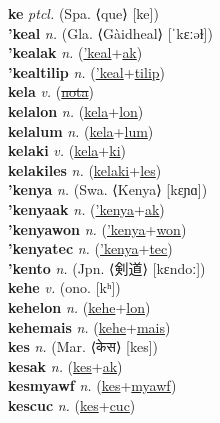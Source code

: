 \textbf{ke} \textit{ptcl.} (Spa. ⟨que⟩ [ke])
 \label{ke} \\
\textbf{'keal} \textit{n.} (Gla. ⟨Gàidheal⟩ [ˈkɛːəɫ])
 \label{'keal} \\
\textbf{'kealak} \textit{n.} (\hyperref['keal]{'keal}+\hyperref[ak]{ak})
 \label{'kealak} \\
\textbf{'kealtilip} \textit{n.} (\hyperref['keal]{'keal}+\hyperref[tilip]{tilip})
 \label{'kealtilip} \\
\textbf{kela} \textit{v.} (\hyperref[nota]{\sout{nota}})
 \label{kela} \\
\textbf{kelalon} \textit{n.} (\hyperref[kela]{kela}+\hyperref[lon]{lon})
 \label{kelalon} \\
\textbf{kelalum} \textit{n.} (\hyperref[kela]{kela}+\hyperref[lum]{lum})
 \label{kelalum} \\
\textbf{kelaki} \textit{v.} (\hyperref[kela]{kela}+\hyperref[ki]{ki})
 \label{kelaki} \\
\textbf{kelakiles} \textit{n.} (\hyperref[kelaki]{kelaki}+\hyperref[les]{les})
 \label{kelakiles} \\
\textbf{'kenya} \textit{n.} (Swa. ⟨Kenya⟩ [kɛɲɑ])
 \label{'kenya} \\
\textbf{'kenyaak} \textit{n.} (\hyperref['kenya]{'kenya}+\hyperref[ak]{ak})
 \label{'kenyaak} \\
\textbf{'kenyawon} \textit{n.} (\hyperref['kenya]{'kenya}+\hyperref[won]{won})
 \label{'kenyawon} \\
\textbf{'kenyatec} \textit{n.} (\hyperref['kenya]{'kenya}+\hyperref[tec]{tec})
 \label{'kenyatec} \\
\textbf{'kento} \textit{n.} (Jpn. ⟨剣道⟩ [kɛndoː])
 \label{'kento} \\
\textbf{kehe} \textit{v.} (ono. [kʰ])
 \label{kehe} \\
\textbf{kehelon} \textit{n.} (\hyperref[kehe]{kehe}+\hyperref[lon]{lon})
 \label{kehelon} \\
\textbf{kehemais} \textit{n.} (\hyperref[kehe]{kehe}+\hyperref[mais]{mais})
 \label{kehemais} \\
\textbf{kes} \textit{n.} (Mar. ⟨केस⟩ [kes])
 \label{kes} \\
\textbf{kesak} \textit{n.} (\hyperref[kes]{kes}+\hyperref[ak]{ak})
 \label{kesak} \\
\textbf{kesmyawf} \textit{n.} (\hyperref[kes]{kes}+\hyperref[myawf]{myawf})
 \label{kesmyawf} \\
\textbf{kescuc} \textit{n.} (\hyperref[kes]{kes}+\hyperref[cuc]{cuc})
 \label{kescuc} \\
